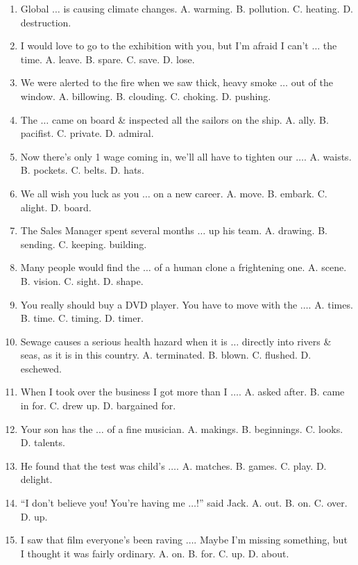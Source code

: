 \documentclass{article}
\numberwithin{equation}{section}
\begin{document}
\begin{enumerate}[leftmargin=8mm]
	\item Global $\ldots$ is causing climate changes. {\sf A.} warming. {\sf B.} pollution. {\sf C.} heating. {\sf D.} destruction.
	\item I would love to go to the exhibition with you, but I'm afraid I can't $\ldots$ the time. {\sf A.} leave. {\sf B.} spare. {\sf C.} save. {\sf D.} lose.
	\item We were alerted to the fire when we saw thick, heavy smoke $\ldots$ out of the window. {\sf A.} billowing. {\sf B.} clouding. {\sf C.} choking. {\sf D.} pushing.
	\item The $\ldots$ came on board \& inspected all the sailors on the ship. {\sf A.} ally. {\sf B.} pacifist. {\sf C.} private. {\sf D.} admiral.
	\item Now there's only 1 wage coming in, we'll all have to tighten our $\ldots$. {\sf A.} waists. {\sf B.} pockets. {\sf C.} belts. {\sf D.} hats.
	\item We all wish you luck as you $\ldots$ on a new career. {\sf A.} move. {\sf B.} embark. {\sf C.} alight. {\sf D.} board.
	\item The Sales Manager spent several months $\ldots$ up his team. {\sf A.} drawing. {\sf B.} sending. {\sf C.} keeping. building.
	\item Many people would find the $\ldots$ of a human clone a frightening one. {\sf A.} scene. {\sf B.} vision. {\sf C.} sight. {\sf D.} shape.
	\item You really should buy a DVD player. You have to move with the $\ldots$. {\sf A.} times. {\sf B.} time. {\sf C.} timing. {\sf D.} timer.
	\item Sewage causes a serious health hazard when it is $\ldots$ directly into rivers \& seas, as it is in this country. {\sf A.} terminated. {\sf B.} blown. {\sf C.} flushed. {\sf D.} eschewed.
	\item When I took over the business I got more than I $\ldots$. {\sf A.} asked after. {\sf B.} came in for. {\sf C.} drew up. {\sf D.} bargained for.
	\item Your son has the $\ldots$ of a fine musician. {\sf A.} makings. {\sf B.} beginnings. {\sf C.} looks. {\sf D.} talents.
	\item He found that the test was child's $\ldots$. {\sf A.} matches. {\sf B.} games. {\sf C.} play. {\sf D.} delight.
	\item ``I don't believe you! You're having me $\ldots$!'' said Jack. {\sf A.} out. {\sf B.} on. {\sf C.} over. {\sf D.} up.
	\item I saw that film everyone's been raving $\ldots$. Maybe I'm missing something, but I thought it was fairly ordinary. {\sf A.} on. {\sf B.} for. {\sf C.} up. {\sf D.} about.

\end{enumerate}
\end{document}
